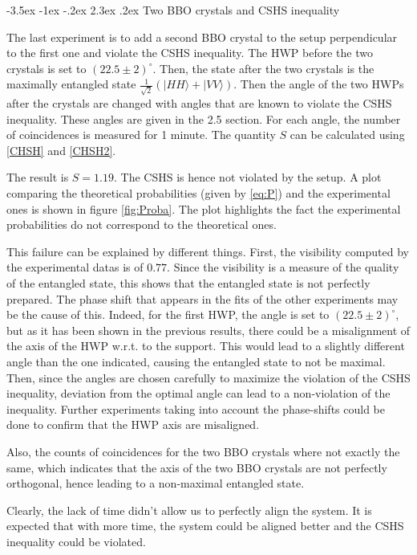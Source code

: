 \documentclass[a4paper, 12pt,oneside]{article}
\makeatletter
\renewcommand{\subsection}{\@startsection {subsection}{1}{\z@}%
             {-3.5ex \@plus -1ex \@minus -.2ex}%
             {2.3ex \@plus.2ex}%
             {\normalfont\normalsize\bfseries}}
\makeatother
\begin{document}
\subsection{Two BBO crystals and CSHS inequality}

The last experiment is to add a second BBO crystal to the setup perpendicular to the first one and violate the CSHS inequality. The HWP before the two crystals is set to $(22.5\pm2)^{\circ}$. Then, the state after the two crystals is the maximally entangled state $\frac{1}{\sqrt{2}}(|HH\rangle + |VV\rangle)$. Then the angle of the two HWPs after the crystals are changed with angles that are known to violate the CSHS inequality. These angles are given in the 2.5 section. For each angle, the number of coincidences is measured for 1 minute. The quantity $S$ can be calculated using \eqref{CHSH} and \eqref{CHSH2}.

The result is $S = 1.19$. The CSHS is hence not violated by the setup. A plot comparing the theoretical probabilities (given by \eqref{eq:P}) and the experimental ones is shown in figure \ref{fig:Proba}. The plot highlights the fact the experimental probabilities do not correspond to the theoretical ones.

This failure can be explained by different things. First, the visibility computed by the experimental datas is of $0.77$. Since the visibility is a measure of the quality of the entangled state, this shows that the entangled state is not perfectly prepared. The phase shift that appears in the fits of the other experiments may be the cause of this. Indeed, for the first HWP, the angle is set to $(22.5\pm2)^{\circ}$, but as it has been shown in the previous results, there could be a misalignment of the axis of the HWP w.r.t. to the support. This would lead to a slightly different angle than the one indicated, causing the entangled state to not be maximal. Then, since the angles are chosen carefully to maximize the violation of the CSHS inequality, deviation from the optimal angle can lead to a non-violation of the inequality. Further experiments taking into account the phase-shifts could be done to confirm that the HWP axis are misaligned. 

Also, the counts of coincidences for the two BBO crystals where not exactly the same, which indicates that the axis of the two BBO crystals are not perfectly orthogonal, hence leading to a non-maximal entangled state.

Clearly, the lack of time didn't allow us to perfectly align the system. It is expected that with more time, the system could be aligned better and the CSHS inequality could be violated.
\end{document}
